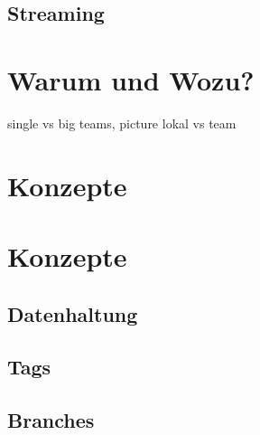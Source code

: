 \subsection{Streaming}
\section{Warum und Wozu?}
single vs big teams, picture lokal vs team
\label{sec:why}
\section{Konzepte}
\label{sec:systems}
\section{Konzepte}
\label{sec:Konzepte}
\subsection{Datenhaltung}
\label{sec:Datenhaltung}
\subsection{Tags}
\label{sec:Tags}
\subsection{Branches}
\label{sec:Branches}
